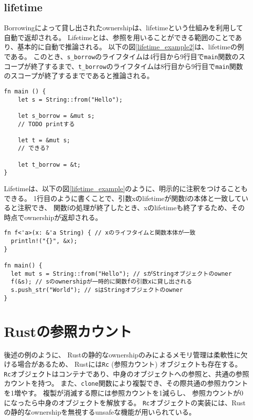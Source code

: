 \documentclass{sumiilab-paper}
\theoremstyle{mystyle}
\numberwithin{definition}{chapter} %
\begin{document}
\subsection{lifetime}
Borrowingによって貸し出されたownershipは、lifetimeという仕組みを利用して自動で返却される。
Lifetimeとは、参照を用いることができる範囲のことであり、基本的に自動で推論される。
以下の図\ref{lifetime_example2}は、lifetimeの例である。
このとき、\texttt{s\_borrow}のライフタイムは4行目から9行目で\texttt{main}関数のスコープが終了するまで、\texttt{t\_borrow}のライフタイムは8行目から9行目で\texttt{main}関数のスコープが終了するまでであると推論される。
\begin{lstlisting}[caption=Lifetimeの例, label=lifetime_example2, captionpos=b]
fn main () {
    let s = String::from("Hello");

    let s_borrow = &mut s;
    // TODO printする

    let t = &mut s;
    // できる?

    let t_borrow = &t;
}
\end{lstlisting}
Lifetimeは、以下の図\ref{lifetime_example}のように、明示的に注釈をつけることもできる。
1行目のように書くことで、引数xのlifetimeが関数fの本体と一致していると注釈でき、
関数fの処理が終了したとき、xのlifetimeも終了するため、その時点でownershipが返却される。
\begin{lstlisting}[caption=Lifetime注釈, label=lifetime_example, captionpos=b]
fn f<'a>(x: &'a String) { // xのライフタイムと関数本体が一致
  println!("{}", &x);
}

fn main() {
  let mut s = String::from("Hello"); // sがStringオブジェクトのowner
  f(&s); // sのownershipが一時的に関数fの引数xに貸し出される
  s.push_str("World"); // sはStringオブジェクトのowner
}
\end{lstlisting}

\section{Rustの参照カウント}
後述の例のように、
Rustの静的なownershipのみによるメモリ管理は柔軟性に欠ける場合があるため、
Rustには\texttt{Rc} (参照カウント) オブジェクトも存在する。
\texttt{Rc}オブジェクトはコンテナであり、中身のオブジェクトへの参照と、共通の参照カウントを持つ。
また、\texttt{clone}関数により複製でき、その際共通の参照カウントを1増やす。
複製が消滅する際には参照カウントを1減らし、
参照カウントが0になったら中身のオブジェクトを解放する。
\texttt{Rc}オブジェクトの実装には、Rustの静的なownershipを無視するunsafeな機能が用いられている。
\end{document}
